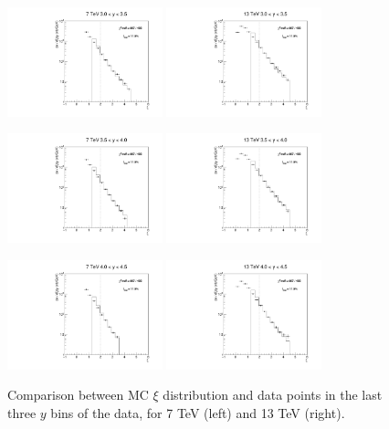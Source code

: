 \documentclass{article}
\begin{document}
\clearpage

\begin{figure}[h!]
\centering
\includegraphics[width = 0.4\textwidth]{xi_7_y7.pdf}
\includegraphics[width = 0.4\textwidth]{xi_13_y7.pdf}

\includegraphics[width = 0.4\textwidth]{xi_7_y8.pdf}
\includegraphics[width = 0.4\textwidth]{xi_13_y8.pdf}

\includegraphics[width = 0.4\textwidth]{xi_7_y9.pdf}
\includegraphics[width = 0.4\textwidth]{xi_13_y9.pdf}
\caption{Comparison between MC $\xi$ distribution and data points in the last three $y$ bins of the data, for 7 TeV (left) and 13 TeV (right).}\label{f:xi_comp_3}
\end{figure}
\end{document}
